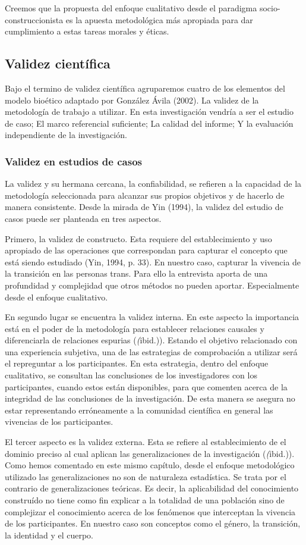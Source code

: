 Creemos que la propuesta del enfoque cualitativo desde el paradigma
socio-construccionista es la apuesta metodológica más apropiada para dar
cumplimiento a estas tareas morales y éticas.

\subsection{Validez científica}
Bajo el termino de validez científica agruparemos cuatro de los elementos del
modelo bioético adaptado por González Ávila (2002).
La validez de la metodología de trabajo a utilizar.
En esta investigación vendría a ser el estudio de caso;
El marco referencial suficiente;
La calidad del informe;
Y la evaluación independiente de la investigación.

    \subsubsection{Validez en estudios de casos}
La validez y su hermana cercana, la confiabilidad, se refieren a la capacidad
de la metodología seleccionada para alcanzar sus propios objetivos y de
hacerlo de manera consistente.
Desde la mirada de Yin (1994), la validez del estudio de casos puede ser
planteada en tres aspectos.

Primero, la validez de constructo.
Esta requiere del establecimiento y uso apropiado de las operaciones que
correspondan para capturar el concepto que está siendo estudiado (Yin, 1994, p.
33).
En nuestro caso, capturar la vivencia de la transición en las personas trans.
Para ello la entrevista aporta de una profundidad y complejidad que otros
métodos no pueden aportar.
Especialmente desde el enfoque cualitativo.

En segundo lugar se encuentra la validez interna.
En este aspecto la importancia está en el poder de la metodología para
establecer relaciones causales y diferenciarla de relaciones espurias
(\emph(ibid.)).
Estando el objetivo relacionado con una experiencia subjetiva, una de las
estrategias de comprobación a utilizar será el repreguntar a los participantes.
En esta estrategia, dentro del enfoque cualitativo, se consultan las
conclusiones de los investigadores con los participantes, cuando estos están
disponibles, para que comenten acerca de la integridad de las conclusiones de
la investigación.
De esta manera se asegura no estar representando erróneamente a la comunidad
científica en general las vivencias de los participantes.

El tercer aspecto es la validez externa.
Esta se refiere al establecimiento de el dominio preciso al cual aplican las
generalizaciones de la investigación (\emph(ibid.)).
Como hemos comentado en este mismo capítulo, desde el enfoque metodológico
utilizado las generalizaciones no son de naturaleza estadística.
Se trata por el contrario de generalizaciones teóricas.
Es decir, la aplicabilidad del conocimiento construído no tiene como fin
explicar a la totalidad de una población sino de complejizar el conocimiento
acerca de los fenómenos que interceptan la vivencia de los participantes.
En nuestro caso son conceptos como el género, la transición, la identidad y el
cuerpo.

